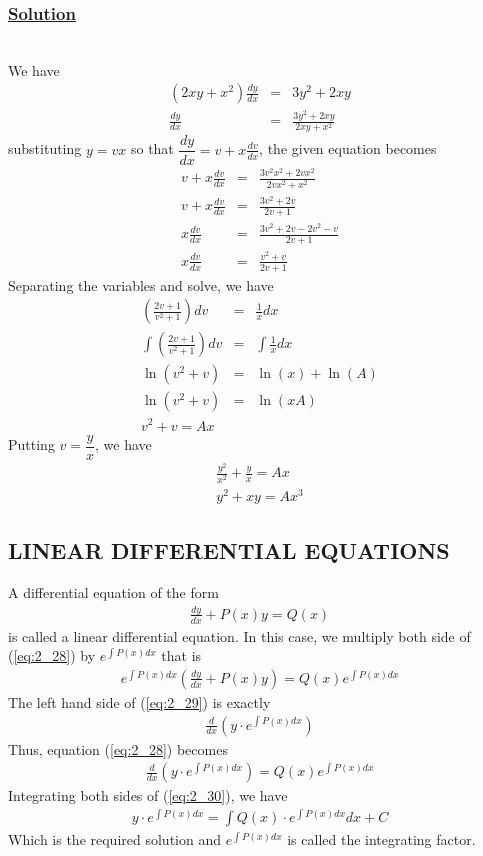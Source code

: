 \documentclass[11pt]{report}
\newcommand{\ubt}[1]{\textbf{\underline{#1}}}
\newcommand{\sps}{\\[0.2cm]}
\newcommand{\spn}[1]{\\[#1cm]}
\newcommand{\refn}[1]{(\ref{#1})}
\newcommand{\refx}[1]{\refn{eq:#1}}
\newcommand{\dsp}{\displaystyle}
\newcommand{\solution}{\subsubsection{\ubt{Solution}}{~}\spn{-1}}
\begin{document}
	\solution
	We have
	\begin{eqnarray*}
			(2xy + x^2)\frac{dy}{dx} &=& 3y^2 + 2xy\sps
			\frac{dy}{dx} &=& \frac{3y^2 + 2xy}{2xy + x^2}
	\end{eqnarray*}
	substituting $y=vx$ so that $\dfrac{dy}{dx}=v + x\frac{dv}{dx}$, the given equation becomes
	\begin{eqnarray*}
		v + x\frac{dv}{dx} &=& \frac{3v^2 x^2 + 2vx^2}{2vx^2 + x^2}\sps
		v + x\frac{dv}{dx} &=& \frac{3v^2 + 2v}{2v + 1}\sps
		x\frac{dv}{dx} &=& \frac{3v^2 + 2v - 2v^2 - v}{2v + 1}\sps
		x\frac{dv}{dx} &=& \frac{v^2 + v}{2v + 1}
	\end{eqnarray*}
	Separating the variables and solve, we have
	\begin{eqnarray*}
		\left(\frac{2v+1}{v^2+1}\right)dv &=& \frac{1}{x}dx\sps
		\int\left(\frac{2v+1}{v^2+1}\right)dv &=& \int \frac{1}{x}dx\sps
		\ln(v^2 + v) &=& \ln(x) + \ln(A)\sps
		\ln(v^2+v) &=& \ln(xA)\sps
		v^2+v = Ax
	\end{eqnarray*}
	Putting $v = \dfrac{y}{x}$, we have
	\begin{eqnarray*}
		\frac{y^2}{x^2} + \frac{y}{x} = Ax\sps
		y^2 + xy = Ax^3
	\end{eqnarray*}
	
	\subsection{LINEAR DIFFERENTIAL EQUATIONS}
	A differential equation of the form
	\begin{eqnarray}
		\frac{dy}{dx} + P(x)y = Q(x) \label{eq:2_28}
	\end{eqnarray}
	is called a linear differential equation. In this case, we multiply both side of \refx{2_28} by $\dsp e^{\int P(x)dx}$ that is
	\begin{eqnarray}
		e^{\int P(x)dx}\left(\frac{dy}{dx} + P(x)y\right)= Q(x)e^{\int P(x)dx}\label{eq:2_29}
	\end{eqnarray}
	The left hand side of \refx{2_29} is exactly 
	\begin{eqnarray*}
		\frac{d}{dx}\left(y\cdot e^{\int P(x)dx} \right)
	\end{eqnarray*}
	Thus, equation \refx{2_28} becomes
	\begin{eqnarray}
		\frac{d}{dx}\left(y\cdot e^{\int P(x)dx} \right) = Q(x)e^{\int P(x)dx}\label{eq:2_30}
	\end{eqnarray}
	Integrating both sides of \refx{2_30}, we have
	\begin{eqnarray*}
		y\cdot e^{\int P(x)dx} = \int Q(x)\cdot e^{\int P(x)dx} dx + C
	\end{eqnarray*}
	Which is the required solution and $e^{\int P(x)dx}$ is called the integrating factor.
	
\end{document}
